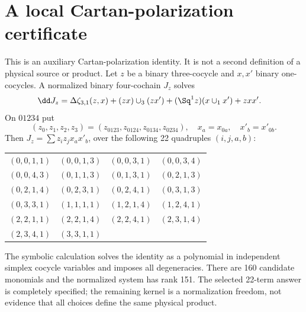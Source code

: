 \section{A local Cartan-polarization certificate}\label{app:derivations}
This is an auxiliary Cartan-polarization identity. It is not a second definition of a physical source or product. Let $z$ be a binary three-cocycle and $x,x'$ binary one-cocycles. A normalized binary four-cochain $J_z$ solves
\begin{align}
\dd J_z={}&\Delta\zeta_{3,1}(z,x)
+(zx)\cup_3(zx')+(\Sq^1z)(x\cup_1x')+zxx'.
\end{align}
On $01234$ put
\begin{equation}
(z_0,z_1,z_2,z_3)=(z_{0123},z_{0124},z_{0134},z_{0234}),
\quad x_a=x_{0a},\quad x'_b=x'_{0b}.
\end{equation}
Then $J_z=\sum z_i z_j x_a x'_b$, over the following 22 quadruples $(i,j,a,b)$:
\begin{center}\small
\begin{tabular}{llll}\toprule
$(0,0,1,1)$&$(0,0,1,3)$&$(0,0,3,1)$&$(0,0,3,4)$\\
$(0,0,4,3)$&$(0,1,1,3)$&$(0,1,3,1)$&$(0,2,1,3)$\\
$(0,2,1,4)$&$(0,2,3,1)$&$(0,2,4,1)$&$(0,3,1,3)$\\
$(0,3,3,1)$&$(1,1,1,1)$&$(1,2,1,4)$&$(1,2,4,1)$\\
$(2,2,1,1)$&$(2,2,1,4)$&$(2,2,4,1)$&$(2,3,1,4)$\\
$(2,3,4,1)$&$(3,3,1,1)$&&\\\bottomrule
\end{tabular}
\end{center}
The symbolic calculation solves the identity as a polynomial in independent simplex cocycle variables and imposes all degeneracies. There are 160 candidate monomials and the normalized system has rank 151. The selected 22-term answer is completely specified; the remaining kernel is a normalization freedom, not evidence that all choices define the same physical product.
